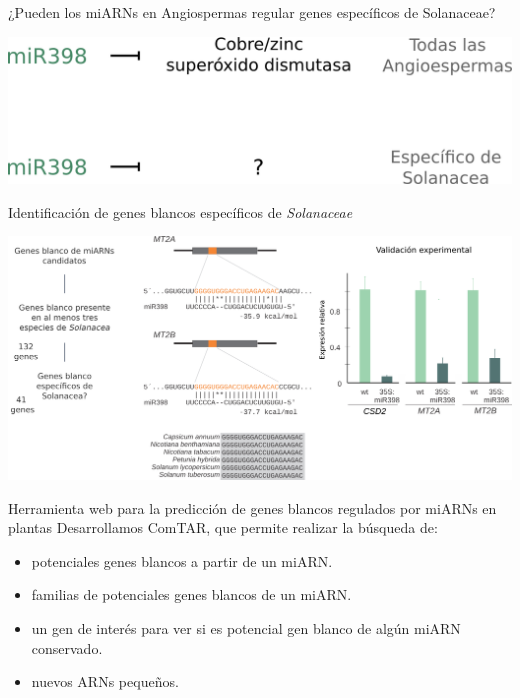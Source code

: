 \documentclass{beamer}
\begin{document}
\begin{frame}{¿Pueden los miARNs en Angiospermas regular genes específicos de Solanaceae?}
	\begin{center}
		\includegraphics[width=.8\textwidth]{img/miR398_solanaceae.png}
	\end{center}
\end{frame}

\begin{frame}{Identificación de genes blancos específicos de \textit{Solanaceae}}
	\begin{center}
		\includegraphics[width=1\textwidth]{img/Figure6_retocada.png}
	\end{center}
\end{frame}


\begin{frame}{Herramienta web para la predicción de genes blancos regulados por miARNs en plantas}
Desarrollamos ComTAR, que permite realizar la búsqueda de:

\begin{itemize}
    \item<2-> potenciales genes blancos a partir de un miARN.
    \item<2-> familias de potenciales genes blancos de un miARN.
    \item<2-> un gen de interés para ver si es potencial gen blanco de algún miARN conservado.
    \item<2-> nuevos ARNs pequeños.
\end{itemize}
    \begin{center}
    \end{center}
\end{frame}
\end{document}
